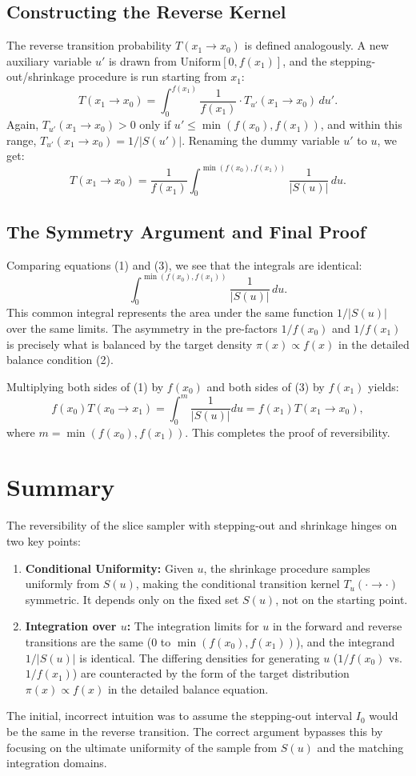 \documentclass[12pt, oneside, paper=A4, DIV=15, BCOR=0mm, abstract=true, headings=small]{scrartcl}
\theoremstyle{customdef}
\begin{document}
\subsection{Constructing the Reverse Kernel}
The reverse transition probability \( T(x_1 \to x_0) \) is defined analogously. A new auxiliary variable \( u' \) is drawn from \( \text{Uniform}[0, f(x_1)] \), and the stepping-out/shrinkage procedure is run starting from \( x_1 \):
\[
T(x_1 \to x_0) = \int_{0}^{f(x_1)} \frac{1}{f(x_1)} \cdot T_{u'}(x_1 \to x_0) \, du'.
\]
Again, \( T_{u'}(x_1 \to x_0) > 0 \) only if \( u' \le \min(f(x_0), f(x_1)) \), and within this range, \( T_{u'}(x_1 \to x_0) = 1 / |S(u')| \). Renaming the dummy variable \( u' \) to \( u \), we get:
\[
T(x_1 \to x_0) = \frac{1}{f(x_1)} \int_{0}^{\min(f(x_0), f(x_1))} \frac{1}{|S(u)|} \, du. \tag{3}
\]

\subsection{The Symmetry Argument and Final Proof}
Comparing equations (1) and (3), we see that the integrals are identical:
\[
\int_{0}^{\min(f(x_0), f(x_1))} \frac{1}{|S(u)|} \, du.
\]
This common integral represents the area under the same function \( 1/|S(u)| \) over the same limits. The asymmetry in the pre-factors \( 1/f(x_0) \) and \( 1/f(x_1) \) is precisely what is balanced by the target density \( \pi(x) \propto f(x) \) in the detailed balance condition (2).

Multiplying both sides of (1) by \( f(x_0) \) and both sides of (3) by \( f(x_1) \) yields:
\[
f(x_0) T(x_0 \to x_1) = \int_{0}^{m} \frac{1}{|S(u)|} du = f(x_1) T(x_1 \to x_0),
\]
where \( m = \min(f(x_0), f(x_1)) \). This completes the proof of reversibility.

\section{Summary}
The reversibility of the slice sampler with stepping-out and shrinkage hinges on two key points:
\begin{enumerate}
    \item \textbf{Conditional Uniformity:} Given \( u \), the shrinkage procedure samples uniformly from \( S(u) \), making the conditional transition kernel \( T_u(\cdot \to \cdot) \) symmetric. It depends only on the fixed set \( S(u) \), not on the starting point.
    \item \textbf{Integration over \( u \):} The integration limits for \( u \) in the forward and reverse transitions are the same (\( 0 \) to \( \min(f(x_0), f(x_1)) \)), and the integrand \( 1/|S(u)| \) is identical. The differing densities for generating \( u \) (\( 1/f(x_0) \) vs. \( 1/f(x_1) \)) are counteracted by the form of the target distribution \( \pi(x) \propto f(x) \) in the detailed balance equation.
\end{enumerate}
The initial, incorrect intuition was to assume the stepping-out interval \( I_0 \) would be the same in the reverse transition. The correct argument bypasses this by focusing on the ultimate uniformity of the sample from \( S(u) \) and the matching integration domains.
\end{document}
